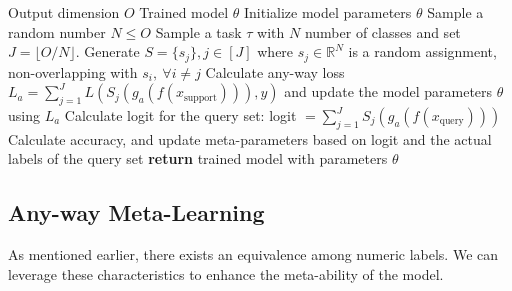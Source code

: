 \documentclass[letterpaper]{article} %
\newcommand{\jh}[1]{\textcolor{blue}{#1}}
\begin{document}
\begin{algorithm*}
\caption{Any-Way Meta-Learning}\label{alg:AnyWayMetaLearning}
\begin{algorithmic}

\Require Output dimension $O$ %
\Ensure Trained model $\theta$
\State Initialize model parameters $\theta$
    \State Sample a random number $N \le O$
    \State Sample a task $\tau$ with $N$ number of classes and set $J = \lfloor O/N \rfloor$.
    \State Generate $S = \{s_j\}, j \in [J]$ where $s_j \in \mathbb{R}^N$ is a random assignment, non-overlapping with $s_i, \ \forall i\neq j$ 
    \State Calculate any-way loss $L_a = \sum_{j=1}^J L(S_j(g_a(f(x_{\text{support}}))),y)$ and update the model parameters $\theta$ using $L_a$
    \State Calculate logit for the query set: logit $=\sum_{j=1}^J S_j(g_a(f(x_{\text{query}})))$
    \State Calculate accuracy, and update meta-parameters based on logit and the actual labels of the query set
\EndFor
\State \textbf{return} trained model with parameters $\theta$

\end{algorithmic}
\end{algorithm*}

\subsection{Any-way Meta-Learning}\label{sec:anywaymetalearning}
As mentioned earlier, there exists an equivalence among numeric labels. %
We can leverage
these characteristics to enhance the meta-ability of the model.
\end{document}
